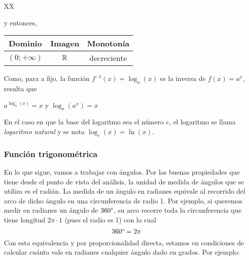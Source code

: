 \documentclass[../teoria.root.tex]{subfiles}
\begin{document}
\begin{tabularx}{\textwidth}{XX}
\begin{center}
\begin{tikzpicture}
\begin{axis}
                    domain=-5:5,
                    samples= 100,
                    ymin=-2,
                    ymax=4
                ]
                \addplot[color=blue] {Log(0.5,\x)};
                \addlegendentry{\(\textstyle\log_\frac{1}{2}(x)\)}
            \end{axis}
        \end{tikzpicture}
    \end{center} y entonces,
    \begin{center}
        \begin{tabular}{|c|c|c|}
            \hline
            Dominio         & Imagen & Monotonía   \\\hline
            \((0;+\infty)\) & \(\mathbb{R}\) & decreciente \\
            \hline
        \end{tabular}
    \end{center}
\end{tabularx}
Como, para a fijo, la función \(f^{−1}(x) = \log_a(x)\) es la inversa de \(f(x) = a^x\), resulta que
\begin{center}
    \(a^{\log_a(x)}=x\) y \(\log_a(a^x)=x\)
\end{center}
En el caso en que la base del logaritmo sea el número \(e\), el logaritmo se llama \textit{logaritmo natural} y se nota \(\log_e(x) = \ln(x)\).
\subsubsection{Función trigonométrica}
En lo que sigue, vamos a trabajar con ángulos.
Por las buenas propiedades que tiene desde el punto de vista del análisis, la unidad de medida de ángulos que se utiliza es el radián.
La medida de un ángulo en radianes equivale al recorrido del arco de dicho ángulo en una circunferencia de radio 1.
Por ejemplo, si queremos medir en radianes un ángulo de \(360\degree\), su arco recorre toda la circunferencia que tiene longitud \(2\pi \cdot 1\) (pues el radio es 1) con lo cual \[360\degree=2\pi\]
Con esta equivalencia y por proporcionalidad directa, estamos en condiciones de calcular cuánto vale en radianes cualquier ángulo dado en grados.
Por ejemplo:
\end{document}
